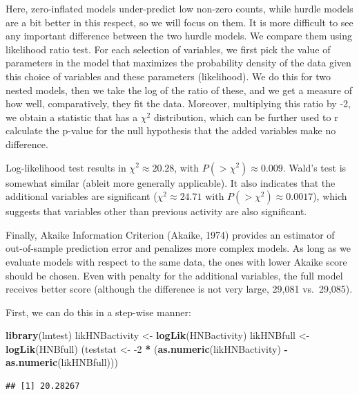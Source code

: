 \documentclass[10pt,]{scrartcl}
\newenvironment{Shaded}{\begin{snugshade}}{\end{snugshade}}
\newcommand{\KeywordTok}[1]{\textcolor[rgb]{0.13,0.29,0.53}{\textbf{#1}}}
\newcommand{\DecValTok}[1]{\textcolor[rgb]{0.00,0.00,0.81}{#1}}
\newcommand{\StringTok}[1]{\textcolor[rgb]{0.31,0.60,0.02}{#1}}
\newcommand{\OperatorTok}[1]{\textcolor[rgb]{0.81,0.36,0.00}{\textbf{#1}}}
\newcommand{\NormalTok}[1]{#1}
\begin{document}
Here, zero-inflated models under-predict low non-zero counts, while
hurdle models are a bit better in this respect, so we will focus on
them. It is more difficult to see any important difference between the
two hurdle models. We compare them using likelihood ratio test. For each
selection of variables, we first pick the value of parameters in the
model that maximizes the probability density of the data given this
choice of variables and these parameters (likelihood). We do this for
two nested models, then we take the log of the ratio of these, and we
get a measure of how well, comparatively, they fit the data. Moreover,
multiplying this ratio by -2, we obtain a statistic that has a
\(\chi^2\) distribution, which can be further used to r calculate the
p-value for the null hypothesis that the added variables make no
difference.

Log-likelihood test results in \(\chi^2 \approx 20.28\), with
\(P(>\chi^2)\approx 0.009\). Wald's test is somewhat similar (ableit
more generally applicable). It also indicates that the additional
variables are significant (\(\chi^2 \approx 24.71\) with
\(P(>\chi^2)\approx 0.0017\)), which suggests that variables other than
previous activity are also significant.

Finally, Akaike Information Criterion (Akaike, 1974) provides an
estimator of out-of-sample prediction error and penalizes more complex
models. As long as we evaluate models with respect to the same data, the
ones with lower Akaike score should be chosen. Even with penalty for the
additional variables, the full model receives better score (although the
difference is not very large, 29,081 vs.~29,085).

First, we can do this in a step-wise manner:

\footnotesize

\begin{Shaded}
\begin{Highlighting}[]
\KeywordTok{library}\NormalTok{(lmtest)}
\NormalTok{likHNBactivity <-}\StringTok{ }\KeywordTok{logLik}\NormalTok{(HNBactivity)}
\NormalTok{likHNBfull <-}\StringTok{ }\KeywordTok{logLik}\NormalTok{(HNBfull)}
\NormalTok{(teststat <-}\StringTok{ }\DecValTok{-2} \OperatorTok{*}\StringTok{ }\NormalTok{(}\KeywordTok{as.numeric}\NormalTok{(likHNBactivity) }\OperatorTok{-}\StringTok{ }\KeywordTok{as.numeric}\NormalTok{(likHNBfull)))}
\end{Highlighting}
\end{Shaded}

\begin{verbatim}
## [1] 20.28267
\end{verbatim}
\end{document}

